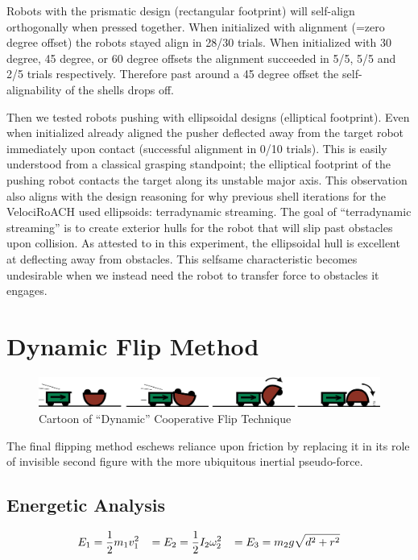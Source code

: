 \documentclass[letterpaper]{report}
\begin{document}
Robots with the prismatic design (rectangular footprint) will self-align orthogonally when pressed together.
When initialized with alignment (=zero degree offset) the robots stayed align in 28/30 trials.
When initialized with 30 degree, 45 degree, or 60 degree offsets the alignment succeeded in 5/5, 5/5 and 2/5 trials respectively.
Therefore past around a 45 degree offset the self-alignability of the shells drops off.

Then we tested robots pushing with ellipsoidal designs (elliptical footprint).
Even when initialized already aligned the pusher deflected away from the target robot immediately upon contact (successful alignment in 0/10 trials).
This is easily understood from a classical grasping standpoint; the elliptical footprint of the pushing robot contacts the target along its unstable major axis.
This observation also aligns with the design reasoning for why previous shell iterations for the VelociRoACH used ellipsoids: terradynamic streaming.
The goal of ``terradynamic streaming'' is to create exterior hulls for the robot that will slip past obstacles upon collision.
As attested to in this experiment, the ellipsoidal hull is excellent at deflecting away from obstacles.
This selfsame characteristic becomes undesirable when we instead need the robot to transfer force to obstacles it engages.

\chapter{Dynamic Flip Method}
\begin{figure}[ht]
\centering
\includegraphics[width=1.0\textwidth]{Dynamic_CoopCartoon.png}
\caption{Cartoon of ``Dynamic'' Cooperative Flip Technique}
\end{figure}
The final flipping method eschews reliance upon friction by replacing it in its role of invisible second figure with the more ubiquitous inertial pseudo-force.

\section{Energetic Analysis}

\begin{align}
E_1 = \frac{1}{2} m_1 v_1^2 \hspace{3mm} = E_2 = \frac{1}{2} I_2 \omega_2^2 \hspace{3mm} = E_3 = m_2 g \sqrt{d^2+r^2}
\end{align}
\end{document}
